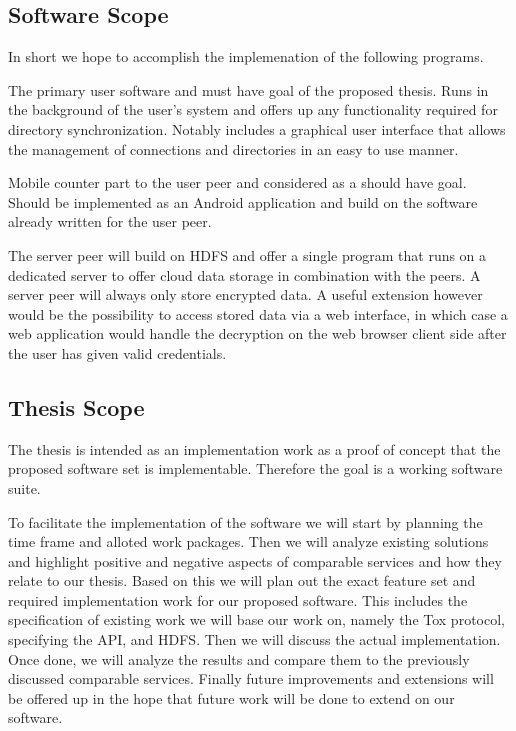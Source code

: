 \documentclass[a4paper,10pt,twoside]{article}
\begin{document}
\subsection{Software Scope}

In short we hope to accomplish the implemenation of the following programs.

\begin{description}[leftmargin=2em,style=nextline,noitemsep,nolistsep]
	\item[User Peer]
		The primary user software and must have goal of the proposed thesis.
		Runs in the background of the user's system and offers up any functionality required for directory synchronization.
		Notably includes a graphical user interface that allows the management of connections and directories in an easy to use manner.
	\item[Mobile Peer]
		Mobile counter part to the user peer and considered as a should have goal.
		Should be implemented as an Android application and build on the software already written for the user peer.
	\item[Server Peer]
		The server peer will build on HDFS and offer a single program that runs on a dedicated server to offer cloud data storage in combination with the peers.
		A server peer will always only store encrypted data.
		A useful extension however would be the possibility to access stored data via a web interface, in which case a web application would handle the decryption on the web browser client side after the user has given valid credentials.
\end{description}

\subsection{Thesis Scope}

The thesis is intended as an implementation work as a proof of concept that the proposed software set is implementable.
Therefore the goal is a working software suite.

To facilitate the implementation of the software we will start by planning the time frame and alloted work packages.
Then we will analyze existing solutions and highlight positive and negative aspects of comparable services and how they relate to our thesis.
Based on this we will plan out the exact feature set and required implementation work for our proposed software.
This includes the specification of existing work we will base our work on, namely the Tox protocol, specifying the API, and HDFS.
Then we will discuss the actual implementation.
Once done, we will analyze the results and compare them to the previously discussed comparable services.
Finally future improvements and extensions will be offered up in the hope that future work will be done to extend on our software.
\end{document}
